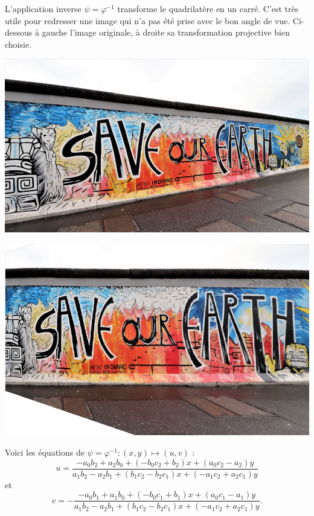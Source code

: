 \documentclass[11pt,class=report,crop=false]{standalone}
\begin{document}
\medskip
	
L'application inverse $\psi = \varphi^{-1}$ transforme le quadrilatère en un carré. C'est très utile pour \og{}redresser\fg{} une image qui n'a pas été prise avec le bon angle de vue. Ci-dessous à gauche l'image originale, à droite sa transformation projective bien choisie.


\begin{center}
	\begin{minipage}{0.45\textwidth}
		\includegraphics[scale=\myscale,scale=0.9]{figures/image-mur-avant}
	\end{minipage}\qquad
	\begin{minipage}{0.5\textwidth}
		\includegraphics[scale=\myscale,scale=0.3]{figures/image-mur-apres}    
	\end{minipage}
\end{center}

Voici les équations de $\psi = \varphi^{-1} : (x,y) \mapsto (u,v)$ :
$$
u = \frac{-a_0b_2 + a_2 b_0 + (- b_0 c_2 + b_2) x + (a_0 c_2 - a_2) y }
{a_1 b_2 - a_2 b_1 + (b_1 c_2  - b_2 c_1) x + (- a_1 c_2  + a_2 c_1) y}
$$
et
$$
v = -\frac{-a_0 b_1 + a_1 b_0 + (- b_0 c_1  + b_1) x + (a_0 c_1  - a_1) y}
{a_1 b_2 - a_2 b_1 + (b_1 c_2 - b_2 c_1) x + (-a_1 c_2 + a_2 c_1) y}.
$$
\end{document}
